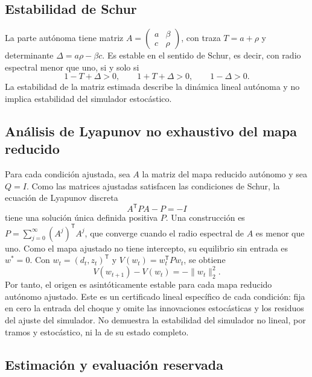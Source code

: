 \subsection{Estabilidad de Schur}

La parte autónoma tiene matriz $A=\begin{pmatrix} a & \beta\\ c & \rho\end{pmatrix}$, con traza $T=a+\rho$ y determinante $\Delta=a\rho-\beta c$. Es estable en el sentido de Schur, es decir, con radio espectral menor que uno, si y solo si \cite{jury1962simplified,schur1917potenzreihen,elaydi2005difference}
\begin{equation}
  1-T+\Delta>0,\qquad 1+T+\Delta>0,\qquad 1-\Delta>0.
  \label{eq:schur}
\end{equation}
La estabilidad de la matriz estimada describe la dinámica lineal autónoma y no implica estabilidad del simulador estocástico.

\subsection{Análisis de Lyapunov no exhaustivo del mapa reducido}

Para cada condición ajustada, sea $A$ la matriz del mapa reducido autónomo y sea $Q=I$. Como las matrices ajustadas satisfacen las condiciones de Schur, la ecuación de Lyapunov discreta
\begin{equation}
  A^{\mathsf T}PA-P=-I
  \label{eq:lyap-reducido}
\end{equation}
tiene una solución única definida positiva $P$. Una construcción es $P=\sum_{j=0}^{\infty}(A^j)^{\mathsf T}A^j$, que converge cuando el radio espectral de $A$ es menor que uno. Como el mapa ajustado no tiene intercepto, su equilibrio sin entrada es $w^*=0$. Con $w_t=(d_t,z_t)^{\mathsf T}$ y $V(w_t)=w_t^{\mathsf T}Pw_t$, se obtiene
\begin{equation}
  V(w_{t+1})-V(w_t)=-\lVert w_t\rVert_2^2.
  \label{eq:lyap-decrecimiento}
\end{equation}
Por tanto, el origen es asintóticamente estable para cada mapa reducido autónomo ajustado. Este es un certificado lineal específico de cada condición: fija en cero la entrada del choque y omite las innovaciones estocásticas y los residuos del ajuste del simulador. No demuestra la estabilidad del simulador no lineal, por tramos y estocástico, ni la de su estado completo.

\subsection{Estimación y evaluación reservada}

